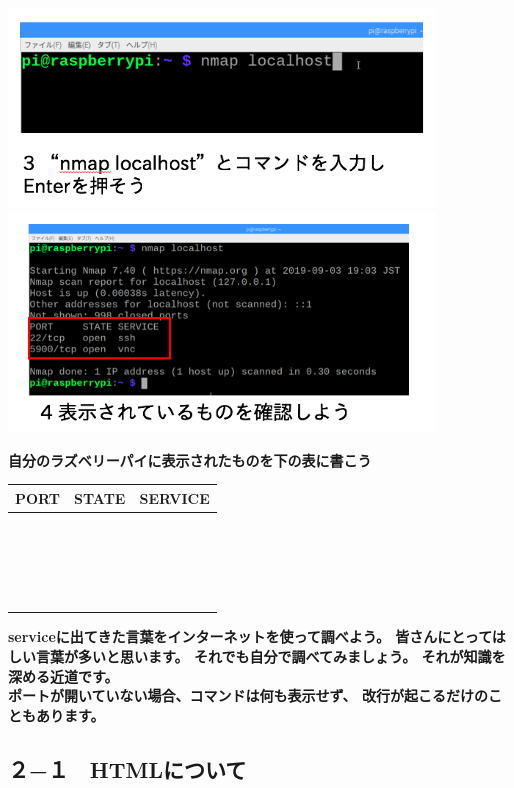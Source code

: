 \documentclass[a4paper,12pt,dvipdfmx]{jarticle}
\newcounter{Exercise}
\begin{document}
\includegraphics[width=0.85\textwidth]{ome7-img032.png}
\bigskip
\includegraphics[width=0.85\textwidth]{ome7-img031.png}
\flushleft

\bigskip
{\bfseries
	自分のラズベリーパイに表示されたものを下の表に書こう}

\begin{flushleft}
	\tablefirsthead{}
	\tablehead{}
	\tabletail{}
	\tablelasttail{}
	\begin{supertabular}{|m{5.467cm}|m{5.4690003cm}|m{5.155cm}|}
		\hline
		PORT &
		STATE &
		SERVICE\\\hline
		~
		&
		~
		&
		~
		\\\hline
		~
		&
		~
		&
		~
		\\\hline
		~
		&
		~
		&
		~
		\\\hline
		~
		&
		~
		&
		~
		\\\hline
	\end{supertabular}
\end{flushleft}
{\bfseries
serviceに出てきた言葉をインターネットを使って調べよう。
皆さんにとってはしい言葉が多いと思います。
それでも自分で調べてみましょう。
それが知識を深める近道です。\\
ポートが開いていない場合、コマンドは何も表示せず、
改行が起こるだけのこともあります。
}

\clearpage\subsection*{２−１　HTMLについて}
\end{document}
